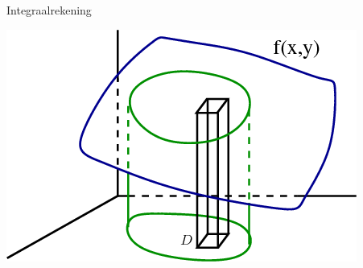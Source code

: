 \documentclass[a4paper,12pt, twoside]{article}
\begin{document}
\begin{center}
  \begin{mdframed}
  \centering
  \fontsize{40}{50}\selectfont Integraalrekening
  \end{mdframed}
  \vfill
  \includegraphics[width=.5\textwidth]{double_integral_volume_under_surface_box}
  \vfill
\end{center}
\end{document}
